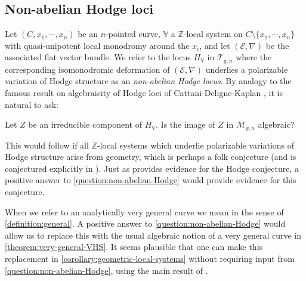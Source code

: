 \subsection{Non-abelian Hodge loci}
Let $(C, x_1, \cdots, x_n)$ be an $n$-pointed curve, $\mathbb{V}$ a
$\mathbb{Z}$-local system on $C\setminus\{x_1, \cdots, x_n\}$ with
quasi-unipotent local monodromy around the $x_i$, and let $(\mathscr{E}, \nabla)$ be the associated flat vector bundle. We refer to the locus $H_{\mathbb{V}}$ in $\mathscr{T}_{g,n}$ where the corresponding isomonodromic deformation of $(\mathscr{E}, \nabla)$ underlies a polarizable variation of Hodge structure as an \emph{non-abelian Hodge locus}. By analogy to the famous result on algebraicity of Hodge loci of Cattani-Deligne-Kaplan \cite{cattani1995locus}, it is natural to ask:
\begin{question}
\notready \label{question:non-abelian-Hodge}
Let $Z$ be an irreducible component of $H_{\mathbb{V}}$. Is the image of $Z$ in $\mathscr{M}_{g,n}$ algebraic?
\end{question}
This would follow if all $\mathbb{Z}$-local systems which underlie polarizable variations of Hodge structure arise from geometry, which is perhaps a folk conjecture (and is conjectured explicitly in \cite[Conjecture 12.4]{simpson62hodge}). Just as \cite{cattani1995locus} provides evidence for the Hodge conjecture, a positive answer to \autoref{question:non-abelian-Hodge} would provide evidence for this conjecture.

When we refer to an analytically very general curve we mean in the sense
of \autoref{definition:general}.
A positive answer to \autoref{question:non-abelian-Hodge} would allow us to replace this with the usual algebraic notion of a very general curve in \autoref{theorem:very-general-VHS}.
It seems plausible that one can make this replacement in \autoref{corollary:geometric-local-systems} without requiring input from \autoref{question:non-abelian-Hodge}, using the main result of \cite{cattani1995locus}.
